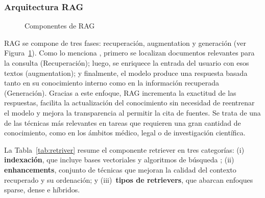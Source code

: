 \subsubsection{Arquitectura RAG}
\begin{figure}[H]
\begin{center}
\end{center}
\caption{Componentes de RAG}
\label{fig:arquitectura_rag}
\end{figure}

RAG se compone de tres fases: recuperación, augmentation y generación (ver Figura~\ref{fig:arquitectura_rag}). Como lo menciona \textcite{gao2023rag}, primero se 
localizan documentos relevantes para la consulta (Recuperación); luego, se enriquece la entrada del usuario con esos textos (augmentation); y finalmente, el modelo produce 
una respuesta basada tanto en su conocimiento interno como en la información recuperada (Generación). Gracias a este enfoque, RAG incrementa la exactitud 
de las respuestas, facilita la actualización del conocimiento sin necesidad de reentrenar el modelo y mejora la transparencia al permitir la 
cita de fuentes. Se trata de una de las técnicas más relevantes en tareas que requieren una gran 
cantidad de conocimiento, como en los ámbitos médico, legal o de investigación científica.

La Tabla~\ref{tab:retriver} resume el componente retriever en tres categorías: (i) \textbf{indexación}, que incluye bases vectoriales y algoritmos de búsqueda ; 
(ii) \textbf{enhancements}, conjunto de técnicas que mejoran la calidad del contexto recuperado y su ordenación; y (iii)~\textbf{tipos de retrievers}, que abarcan enfoques 
sparse, dense e híbridos.

